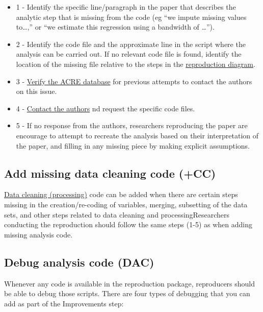 \documentclass[]{book}
\begin{document}
\begin{itemize}
\item
  1 - Identify the specific line/paragraph in the paper that describes the analytic step that is missing from the code (eg ``we impute missing values to\ldots{},'' or ``we estimate this regression using a bandwidth of \ldots{}'').
\item
  2 - Identify the code file and the approximate line in the script where the analysis can be carried out. If no relevant code file is found, identify the location of the missing file relative to the steps in the \protect\hyperlink{diagram}{reproduction diagram}.
\item
  3 - \href{ADD\%20LINK}{Verify the ACRE database} for previous attempts to contact the authors on this issue.
\item
  4 - \protect\hyperlink{tips-for-communication}{Contact the authors} nd request the specific code files.
\item
  5 - If no response from the authors, researchers reproducing the paper are encourage to attempt to recreate the analysis based on their interpretation of the paper, and filling in any missing piece by making explicit assumptions.
\end{itemize}

\hypertarget{cc}{%
\subsection{Add missing data cleaning code (+CC)}\label{cc}}

\protect\hyperlink{describe-inputs}{Data cleaning (processing)} code can be added when there are certain steps missing in the creation/re-coding of variables, merging, subsetting of the data sets, and other steps related to data cleaning and processingResearchers conducting the reproduction should follow the same steps (1-5) as when adding missing analysis code.

\hypertarget{dac}{%
\subsection{Debug analysis code (DAC)}\label{dac}}

Whenever any code is available in the reproduction package, reproducers should be able to debug those scripts. There are four types of debugging that you can add as part of the Improvements step:
\end{document}
